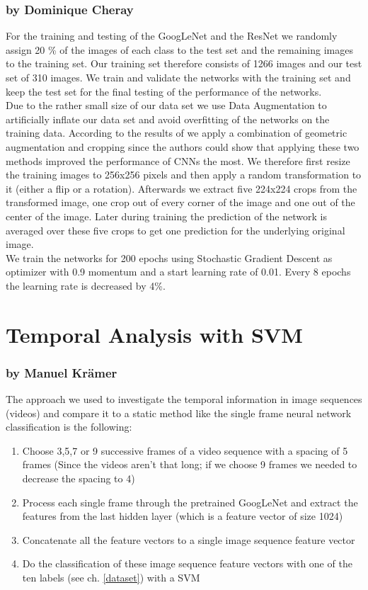 \documentclass[11pt]{report}
\begin{document}
\subsubsection{by Dominique Cheray}
For the training and testing of the GoogLeNet and the ResNet we randomly
assign 20 \% of the images of each class to the test set and the remaining
images to the training set. Our training set therefore consists of 1266 images
and our test set of 310 images. We train and validate the networks with the
training set and keep the test set for the final testing of the performance
of the networks. \\
Due to the rather small size of our data set we use Data Augmentation to
artificially inflate our data set and avoid overfitting of the networks on the
training data. According to the results of \cite{taylor2017imporving} we apply
a combination of geometric augmentation and cropping since the authors could
show that applying these two methods improved the performance of CNNs
the most. We therefore first resize the training images to 256x256 pixels and
then apply a random transformation to it (either a flip or a rotation).
Afterwards we extract five 224x224 crops from the transformed image, one crop
out of every corner of the image and one out of the center of the image. Later
during training the prediction of the network is averaged over these five crops
to get one prediction for the underlying original image. \\
We train the networks for 200 epochs using Stochastic Gradient Descent as
optimizer with 0.9 momentum and a start learning rate of 0.01. Every 8 epochs
the learning rate is decreased by 4\%. 


\section{Temporal Analysis with SVM}
\label{TempAnalysis_SVM}
\subsubsection{by Manuel Krämer}
The approach we used to investigate the temporal information in image sequences (videos) and compare it to a static method like the single frame neural network classification is the following:

\begin{enumerate} 
\item Choose 3,5,7 or 9 successive frames of a video sequence with a spacing of 5 frames (Since the videos aren't that long; if we choose 9 frames we needed to decrease the spacing to 4)
\item Process each single frame through the pretrained GoogLeNet and extract the features from the last hidden layer (which is a feature vector of size 1024)
\item Concatenate all the feature vectors to a single image sequence feature vector
\item Do the classification of these image sequence feature vectors with one of the ten labels (see ch. \ref{dataset}) with a SVM
\end{enumerate}
\end{document}
